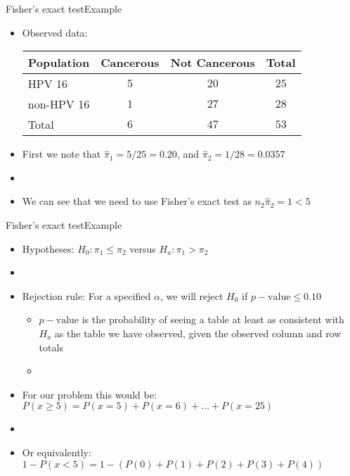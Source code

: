 \documentclass[xcolor=dvipsnames]{beamer}
\begin{document}
\begin{frame}{Fisher's exact test}{Example}
	\begin{itemize}
		\item Observed data:
		\begin{center}
			\begin{tabular}{l|cc|c}
				\hline
				\textbf{Population} & \textbf{Cancerous} & \textbf{Not Cancerous} & \textbf{Total} \\ \hline \hline
				HPV 16 & $5$ &$20$ & $25$\\
				non-HPV 16 & $1$ &$27$ & $28$ \\
				Total & $6$ & $47$ & $53$ \\ \hline
			\end{tabular}
		\end{center} \pause
	\vspace{5mm}
	\item First we note that $\hat{\pi}_1 = 5/25 = 0.20$, and $\hat{\pi}_2 = 1/28 = 0.0357$   \pause
	\item[]
	\item We can see that we need to use Fisher's exact test as $n_2 \hat{\pi}_2 =1 <5$
	\end{itemize}
\end{frame}

\begin{frame}{Fisher's exact test}{Example}
	\begin{itemize}
		\item Hypotheses: $H_0: \pi_1 \leq \pi_2$ versus $H_a: \pi_1 > \pi_2$  \pause
		\item[]
		\item Rejection rule: For a specified $\alpha$, we will reject $H_0$ if $p-\text{value} \leq 0.10$  \pause
		\begin{itemize}
			\item $p-\text{value}$ is the probability of seeing a table at least as consistent with $H_a$ as the table we have observed, given the observed column and row totals  \pause
			\item[]
		\end{itemize}
	\item For our problem this would be: $P(x \geq 5) = P(x = 5)+P(x = 6)+\hdots + P(x = 25)$  \pause
	\item[]
	\item Or equivalently:
	$1-P(x < 5) = 1-(P(0) + P(1) + P(2) + P(3) + P(4))$
	\end{itemize}
\end{frame}
\end{document}

